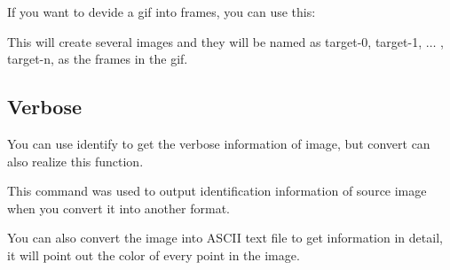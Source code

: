 \documentclass[12pt]{article}
\begin{document}
If you want to devide a gif into frames, you can use this:\vspace{5mm}

{\centering{}\par}\vspace{5mm}

This will create several images and they will be named as target-0, target-1, $\dots$ , target-n, as the frames in the gif.

\subsection{Verbose}

You can use identify to get the verbose information of image, but convert can also realize this function.\vspace{5mm}

{\centering{}\par}\vspace{5mm}

This command was used to output identification information of source image when you convert it into another format.

You can also convert the image into ASCII text file to get information in detail, it will point out the color of every point in the image.
\end{document}
